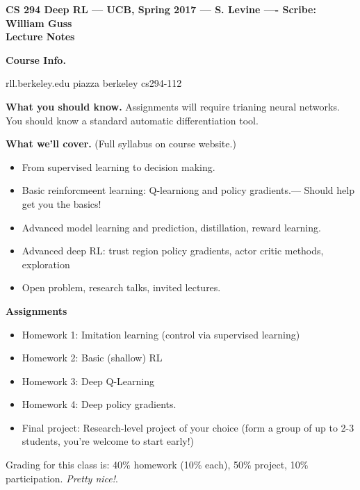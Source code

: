 \documentclass[11pt]{amsart}
\theoremstyle{definition}
\numberwithin{theorem}{section}
\numberwithin{definition}{section}
\numberwithin{equation}{section}
\begin{document}
\begin{center}{\bf CS 294 Deep RL --- UCB, Spring 2017 --- S. Levine ---- Scribe: William Guss}
\\
{\bf Lecture Notes}
\end{center}
\medskip \noindent \textbf{Course Info.}

rll.berkeley.edu
piazza berkeley cs294-112

\medskip \noindent \textbf{What you should know.}
Assignments will require trianing neural networks. You should know a standard automatic differentiation tool.

\medskip \noindent \textbf{What we'll cover.} (Full syllabus on course website.)
\begin{itemize}
	\item From supervised learning to decision making.
	\item Basic reinforcmeent learning: Q-learniong and policy gradients.--- Should help get you the basics!
	\item Advanced model learning and prediction, distillation, reward learning.
	\item Advanced deep RL: trust region policy gradients, actor critic methods, exploration
	\item Open problem, research talks, invited lectures.
\end{itemize}

\textbf{Assignments}
\begin{itemize}
\item Homework 1: Imitation learning (control via supervised learning)
\item Homework 2: Basic (shallow) RL
\item Homework 3: Deep Q-Learning
\item Homework 4: Deep policy gradients.
\item Final project: Research-level project of your choice (form a group of up to 2-3 students, you're welcome to start early!)
\end{itemize}

Grading for this class is: 40\% homework (10\% each), 50\% project, 10\% participation. \emph{Pretty nice!}.
\end{document}
